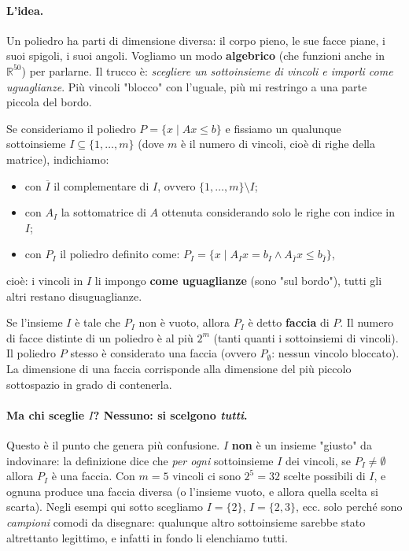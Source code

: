 \documentclass[12pt]{extarticle} %
\begin{document}
\paragraph{L'idea.} Un poliedro ha parti di dimensione diversa: il corpo pieno, le sue facce piane, i suoi spigoli, i suoi angoli. Vogliamo un modo \textbf{algebrico} (che funzioni anche in $\mathbb{R}^{50}$) per parlarne. Il trucco è: \emph{scegliere un sottoinsieme di vincoli e imporli come uguaglianze}. Più vincoli "blocco" con l'uguale, più mi restringo a una parte piccola del bordo.

\medskip
\noindent Se consideriamo il poliedro $P = \{x \mid Ax \le b\}$ e fissiamo un qualunque sottoinsieme $I \subseteq \{1, \dots, m\}$ (dove $m$ è il numero di vincoli, cioè di righe della matrice), indichiamo:
\begin{itemize}
    \item con $\overline{I}$ il complementare di $I$, ovvero $\{1, \dots, m\} \setminus I$;
    \item con $A_I$ la sottomatrice di $A$ ottenuta considerando solo le righe con indice in $I$;
    \item con $P_I$ il poliedro definito come: $P_I = \{x \mid A_I x = b_I \wedge A_{\overline{I}} x \le b_{\overline{I}}\}$,
\end{itemize}
cioè: i vincoli in $I$ li impongo \textbf{come uguaglianze} (sono "sul bordo"), tutti gli altri restano disuguaglianze.

Se l'insieme $I$ è tale che $P_I$ non è vuoto, allora $P_I$ è detto \textbf{faccia} di $P$.
Il numero di facce distinte di un poliedro è al più $2^m$ (tanti quanti i sottoinsiemi di vincoli). Il poliedro $P$ stesso è considerato una faccia (ovvero $P_\emptyset$: nessun vincolo bloccato). La dimensione di una faccia corrisponde alla dimensione del più piccolo sottospazio in grado di contenerla.

\paragraph{Ma chi sceglie $I$? Nessuno: si scelgono \emph{tutti}.}
Questo è il punto che genera più confusione. $I$ \textbf{non} è un insieme "giusto" da indovinare: la definizione dice che \emph{per ogni} sottoinsieme $I$ dei vincoli, se $P_I \ne \emptyset$ allora $P_I$ è una faccia. Con $m=5$ vincoli ci sono $2^5=32$ scelte possibili di $I$, e ognuna produce una faccia diversa (o l'insieme vuoto, e allora quella scelta si scarta). Negli esempi qui sotto scegliamo $I=\{2\}$, $I=\{2,3\}$, ecc. solo perché sono \emph{campioni} comodi da disegnare: qualunque altro sottoinsieme sarebbe stato altrettanto legittimo, e infatti in fondo li elenchiamo tutti.
\end{document}
